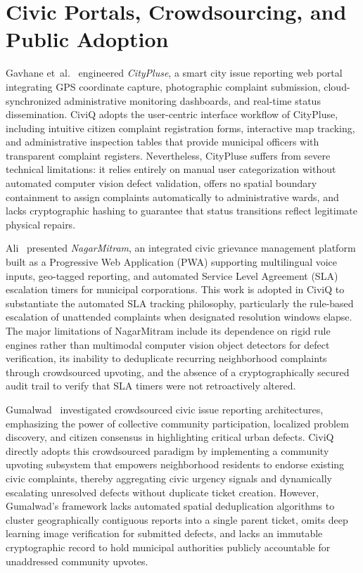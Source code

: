 \documentclass[12pt,a4paper]{report}
\begin{document}
\section{Civic Portals, Crowdsourcing, and Public Adoption}

Gavhane et~al.~\cite{ref_gavhane2026_citypluse} engineered \textit{CityPluse}, a smart city issue reporting web portal integrating GPS coordinate capture, photographic complaint submission, cloud-synchronized administrative monitoring dashboards, and real-time status dissemination. CiviQ adopts the user-centric interface workflow of CityPluse, including intuitive citizen complaint registration forms, interactive map tracking, and administrative inspection tables that provide municipal officers with transparent complaint registers. Nevertheless, CityPluse suffers from severe technical limitations: it relies entirely on manual user categorization without automated computer vision defect validation, offers no spatial boundary containment to assign complaints automatically to administrative wards, and lacks cryptographic hashing to guarantee that status transitions reflect legitimate physical repairs.

Ali~\cite{ref_ali2026_nagarmitram} presented \textit{NagarMitram}, an integrated civic grievance management platform built as a Progressive Web Application (PWA) supporting multilingual voice inputs, geo-tagged reporting, and automated Service Level Agreement (SLA) escalation timers for municipal corporations. This work is adopted in CiviQ to substantiate the automated SLA tracking philosophy, particularly the rule-based escalation of unattended complaints when designated resolution windows elapse. The major limitations of NagarMitram include its dependence on rigid rule engines rather than multimodal computer vision object detectors for defect verification, its inability to deduplicate recurring neighborhood complaints through crowdsourced upvoting, and the absence of a cryptographically secured audit trail to verify that SLA timers were not retroactively altered.

Gumalwad~\cite{ref_gumalwad2026_crowdsourced} investigated crowdsourced civic issue reporting architectures, emphasizing the power of collective community participation, localized problem discovery, and citizen consensus in highlighting critical urban defects. CiviQ directly adopts this crowdsourced paradigm by implementing a community upvoting subsystem that empowers neighborhood residents to endorse existing civic complaints, thereby aggregating civic urgency signals and dynamically escalating unresolved defects without duplicate ticket creation. However, Gumalwad's framework lacks automated spatial deduplication algorithms to cluster geographically contiguous reports into a single parent ticket, omits deep learning image verification for submitted defects, and lacks an immutable cryptographic record to hold municipal authorities publicly accountable for unaddressed community upvotes.
\end{document}

